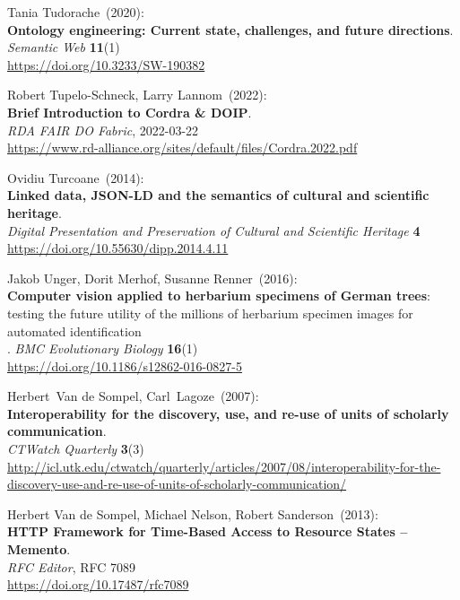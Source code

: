 \begin{thebibliography}{9}
Tania Tudorache~(2020): \\
\textbf{Ontology engineering: Current state, challenges, and future directions}.\\
\emph{Semantic Web} \textbf{11}(1)\\
\url{https://doi.org/10.3233/SW-190382}

Robert Tupelo-Schneck, Larry Lannom~(2022): \\
\textbf{Brief Introduction to Cordra \& DOIP}.\\
\emph{RDA FAIR DO Fabric}, 2022-03-22\\
\url{https://www.rd-alliance.org/sites/default/files/Cordra.2022.pdf}

Ovidiu Turcoane~(2014): \\
\textbf{Linked data, {JSON-LD} and the semantics of cultural and scientific heritage}. \\
\emph{Digital Presentation and Preservation of Cultural and Scientific Heritage} \textbf{4} \\
\url{https://doi.org/10.55630/dipp.2014.4.11}

Jakob Unger, Dorit Merhof, Susanne Renner~(2016): \\
\textbf{Computer vision applied to herbarium specimens of German trees}: testing the future utility of the millions of herbarium specimen images for automated identification\\. 
\emph{BMC Evolutionary Biology} \textbf{16}(1)\\
\url{https://doi.org/10.1186/s12862-016-0827-5}

Herbert~Van de Sompel, Carl~Lagoze~(2007): \\
\textbf{Interoperability for the discovery, use, and re-use of units of scholarly communication}.\\
\emph{CTWatch Quarterly} \textbf{3}(3)\\
\url{http://icl.utk.edu/ctwatch/quarterly/articles/2007/08/interoperability-for-the-discovery-use-and-re-use-of-units-of-scholarly-communication/}

Herbert Van de Sompel, Michael Nelson, Robert Sanderson~(2013): \\
\textbf{{HTTP Framework} for {Time-Based Access} to {Resource States} --{Memento}}.\\
\emph{RFC Editor}, RFC 7089\\
\url{https://doi.org/10.17487/rfc7089}


\end{thebibliography}
